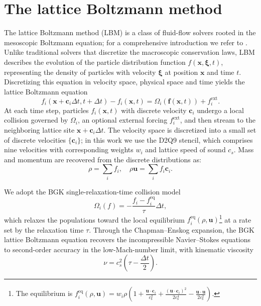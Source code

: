 \documentclass[]{elsarticle}
\begin{document}
\section{The lattice Boltzmann method}\label{sec:lattice-boltzmann-method}
The lattice Boltzmann method (LBM) is a class of fluid-flow solvers rooted in the mesoscopic Boltzmann equation; for a comprehensive introduction we refer to \cite{kruger_lattice_2017}. Unlike traditional solvers that discretize the macroscopic conservation laws, LBM describes the evolution of the particle distribution function $f(\boldsymbol{x}, \boldsymbol{\xi}, t)$, representing the density of particles with velocity $\boldsymbol{\xi}$ at position $\boldsymbol{x}$ and time $t$. Discretizing this equation in velocity space, physical space and time yields the lattice Boltzmann equation
\begin{equation} \label{eq:lattice-boltzmann-equation}
    f_i(\boldsymbol{x}+\boldsymbol{c}_i \Delta t, t+\Delta t)-f_i(\boldsymbol{x}, t)=\Omega_i(\boldsymbol{f}(\boldsymbol{x}, t)) + f^{\text{ext}}_i.
\end{equation}
At each time step, particles $f_i(\boldsymbol{x}, t)$ with discrete velocity $\boldsymbol{c}_i$ undergo a local collision governed by $\Omega_i$, an optional external forcing $f^{\text{ext}}_i$, and then stream to the neighboring lattice site $\boldsymbol{x}+\boldsymbol{c}_i \Delta t$. The velocity space is discretized into a small set of discrete velocities $\{\boldsymbol{c}_i\}$; in this work we use the D2Q9 stencil, which comprises nine velocities with corresponding weights $w_i$ and lattice speed of sound $c_s$. Mass and momentum are recovered from the discrete distributions as:
\begin{equation}
    \rho = \sum_i f_i, \quad \rho \boldsymbol{u} = \sum_i f_i \boldsymbol{c}_i.
\end{equation}

We adopt the BGK single-relaxation-time collision model
\begin{equation}
    \Omega_i(f)=-\frac{f_i-f_i^{\text{eq}}}{\tau} \Delta t,
\end{equation}
which relaxes the populations toward the local equilibrium $f^\text{eq}_i(\rho, \boldsymbol{u})$\footnote{The equilibrium is $f_i^{\text{eq}}(\rho, \boldsymbol{u})=w_i \rho\left(1+\frac{\boldsymbol{u} \cdot \boldsymbol{c}_i}{c_{\text{s}}^2}+\frac{\left(\boldsymbol{u} \cdot \boldsymbol{c}_i\right)^2}{2 c_{\text{s}}^4}-\frac{\boldsymbol{u} \cdot \boldsymbol{u}}{2 c_{\text{s}}^2}\right)$.} at a rate set by the relaxation time $\tau$.
Through the Chapman--Enskog expansion, the BGK lattice Boltzmann equation recovers the incompressible Navier--Stokes equations to second-order accuracy in the low-Mach-number limit, with kinematic viscosity
\begin{equation}
    \nu = c_s^2\left( \tau - \frac{\Delta t}{2} \right).
\end{equation}
\end{document}
